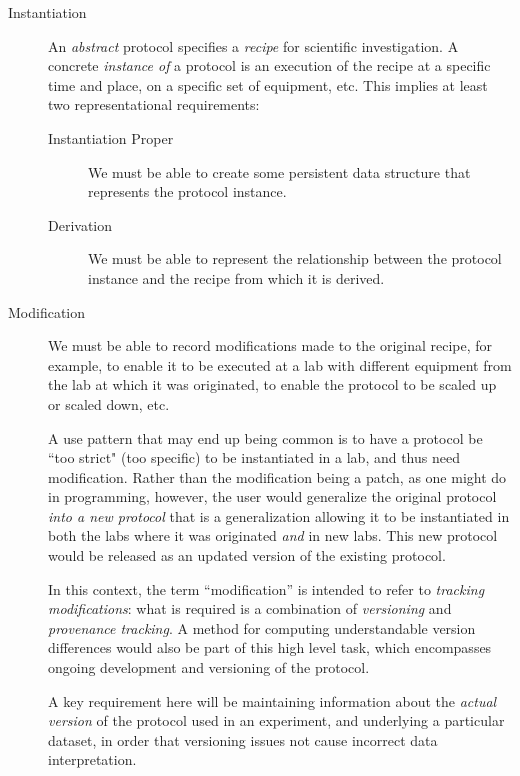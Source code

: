 \begin{description}
\item[Instantiation] An \emph{abstract} protocol specifies a \emph{recipe} for scientific investigation.  A concrete \emph{instance of} a protocol is an execution of the recipe at a specific time and place, on a specific set of equipment, etc.  This implies at least two representational requirements:
  \begin{description}
  \item[Instantiation Proper] We must be able to create some persistent data structure that represents the protocol instance.
  \item[Derivation] We must be able to represent the relationship between the protocol instance and the recipe from which it is derived.
  \end{description}

\item[Modification] We must be able to record modifications made to the original recipe, for example, to enable it to be executed at a lab with different equipment from the lab at which it was originated, to enable the protocol to be scaled up or scaled down, etc.

A use pattern that may end up being common is to have a protocol be ``too strict" (too specific) to be instantiated in a lab, and thus need modification. Rather than the modification being a patch, as one might do in programming, however, the user would generalize the original protocol \emph{into a new protocol} that is a generalization allowing it to be instantiated in both the labs where it was originated \emph{and} in new labs.  This new protocol would be released as an updated version of the existing protocol.

In this context, the term ``modification'' is intended to refer to \emph{tracking modifications}: what is required is a combination of \emph{versioning} and \emph{provenance tracking}.  A method for computing understandable version differences would also be part of this high level task, which encompasses ongoing development and versioning of the protocol.

A key requirement here will be maintaining information about the \emph{actual version} of the protocol used in an experiment, and underlying a particular dataset, in order that versioning issues not cause incorrect data interpretation.


\end{description}
